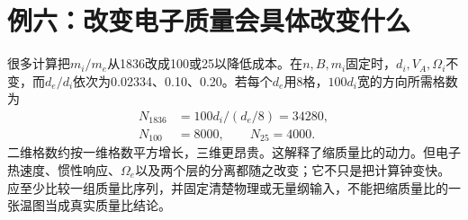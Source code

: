 \section{例六：改变电子质量会具体改变什么}
很多计算把$m_i/m_e$从1836改成100或25以降低成本。在$n,B,m_i$固定时，$d_i,V_A,\Omega_i$不变，而$d_e/d_i$依次为0.02334、0.10、0.20。若每个$d_e$用8格，$100d_i$宽的方向所需格数为
\begin{align}
N_{1836}&=100d_i/(d_e/8)=34280,\\
N_{100}&=8000,\qquad N_{25}=4000.
\end{align}
二维格数约按一维格数平方增长，三维更昂贵。这解释了缩质量比的动力。但电子热速度、惯性响应、$\Omega_e$以及两个层的分离都随之改变；它不只是把计算钟变快。应至少比较一组质量比序列，并固定清楚物理或无量纲输入，不能把缩质量比的一张温图当成真实质量比结论。

